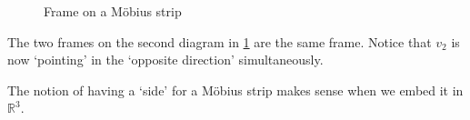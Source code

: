 \documentclass[notoc,notitlepage]{tufte-book}
\begin{document}
\begin{eg}
\begin{itemize}
\begin{figure}[ht]
        \caption{Frame on a M\"{o}bius strip}
        \label{fig:frame_on_a_mobius_strip}
      \end{figure}

      The two frames on the second diagram in \cref{fig:frame_on_a_mobius_strip} are the
      same frame. Notice that $v_2$ is now `pointing' in the `opposite direction'
      simultaneously.
  \end{itemize}
\end{eg}

\begin{note}
  The notion of having a `side' for a M\"{o}bius strip makes sense when we embed it in
  $\mathbb{R}^3$.
\end{note}
\end{document}
